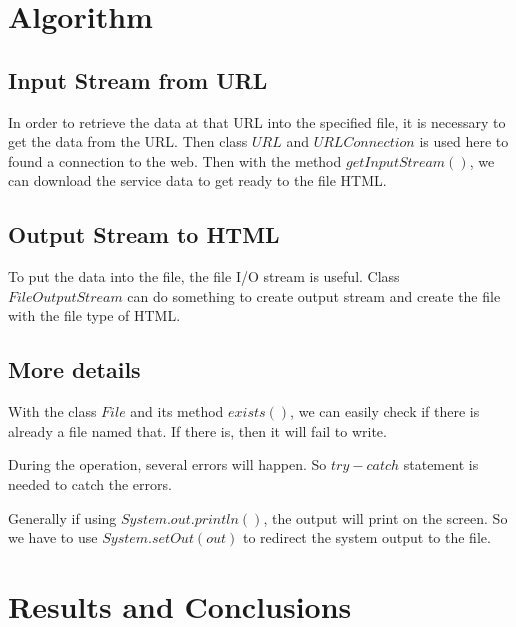 \documentclass{article}
\begin{document}

\section{Algorithm}

\subsection{Input Stream from URL}
In order to retrieve the data at that URL into the specified file, it is necessary to get the data from the URL. Then class $URL$ and $URLConnection$ is used here to found a connection to the web. Then with the method $getInputStream()$, we can download the service data to get ready to the file HTML.

\subsection{Output Stream to HTML}
To put the data into the file, the file I/O stream is useful. Class $FileOutputStream$ can do something to create output stream and create the file with the file type of HTML.

\subsection{More details}
\begin{compactitem}
\item With the class $File$ and its method $exists()$, we can easily check if there is already a file named that. If there is, then it will fail to write.
\item During the operation, several errors will happen. So $try-catch$ statement is needed to catch the errors.
\item Generally if using $System.out.println()$, the output will print on the screen. So we have to use $System.setOut(out)$ to redirect the system output to the file.
\end{compactitem}


\section{Results and Conclusions}
\end{document}
